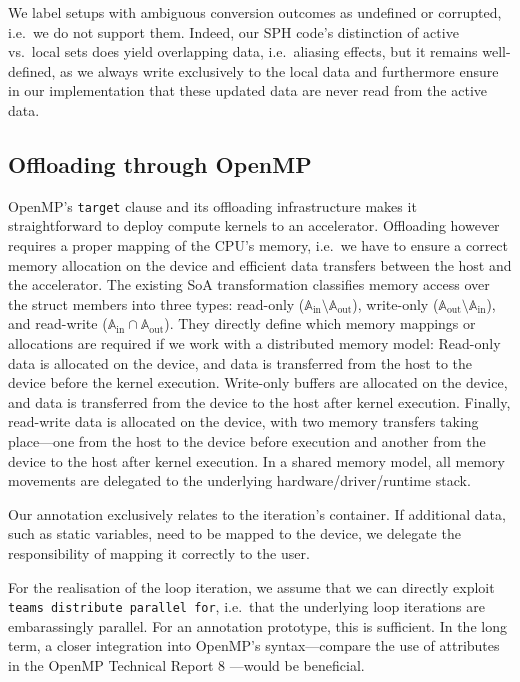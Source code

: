 We label setups with ambiguous conversion outcomes as undefined or corrupted, i.e.~we do not support them.
Indeed, our SPH code's distinction of active vs.~local sets does yield overlapping data, i.e.~aliasing effects, but it remains well-defined, as we always write exclusively to the local data and furthermore ensure in our implementation that these updated data are never read from the active data.


\subsection{Offloading through OpenMP}

OpenMP's \texttt{target} clause and its offloading infrastructure makes it straightforward to deploy compute kernels to an accelerator.
Offloading however requires a proper mapping of the CPU's memory, i.e.~we have to ensure a correct memory allocation on the device and efficient data transfers between the host and the accelerator.
The existing SoA transformation classifies memory access over the struct members into three types: 
read-only ($\mathbb{A}_{\text{in}} \setminus \mathbb{A}_{\text{out}}$), write-only ($\mathbb{A}_{\text{out}} \setminus \mathbb{A}_{\text{in}}$), and read-write ($\mathbb{A}_{\text{in}} \cap \mathbb{A}_{\text{out}}$). 
They directly define which memory mappings or allocations are required if we work with a distributed memory model:
Read-only data is allocated on the device, and data is transferred from the host to the device before the kernel execution. 
Write-only buffers are allocated on the device, and data is transferred from the device to the host after kernel execution. 
Finally, read-write data is allocated on the device, with two memory transfers taking place---one from the host to the device before execution and another from the device to the host after kernel execution.
In a shared memory model, all memory movements are delegated to the underlying hardware/driver/runtime stack.

Our annotation exclusively relates to the iteration's container. If additional data, such as static variables, need to be mapped to the device, we delegate the responsibility of mapping it correctly to the user.

For the realisation of the loop iteration, we assume that we can directly exploit \texttt{teams distribute parallel for}, i.e.~that the underlying loop iterations are embarassingly parallel.
For an annotation prototype, this is sufficient.
In the long term, a closer integration into OpenMP's syntax---compare the use of attributes in the OpenMP Technical Report 8 \cite{OpenMP:TechnicalReport8}---would be beneficial.

